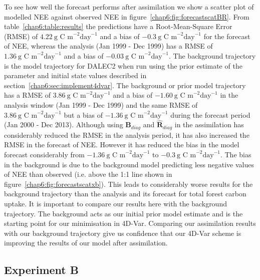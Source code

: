 To see how well the forecast performs after assimilation we show a scatter plot of modelled NEE against observed NEE in figure~\ref{chap6:fig:forecastscatBR}. From table~\ref{chap6:table:results} the predictions have a Root-Mean-Square Error (RMSE) of $4.22 ~\text{g C m}^{-2}\text{day}^{-1}$ and a bias of $-0.3 ~\text{g C m}^{-2}\text{day}^{-1}$ for the forecast of NEE, whereas the analysis (Jan 1999 - Dec 1999) has a RMSE of $1.36 ~\text{g C m}^{-2}\text{day}^{-1}$ and a bias of $-0.03 ~\text{g C m}^{-2}\text{day}^{-1}$. The background trajectory is the model trajectory for DALEC2 when run using the prior estimate of the parameter and initial state values described in section~\ref{chap6:sec:implement4dvar}. The background or prior model trajectory has a RMSE of $3.86 ~\text{g C m}^{-2}\text{day}^{-1}$ and a bias of $-1.60 ~\text{g C m}^{-2}\text{day}^{-1}$ in the analysis window (Jan 1999 - Dec 1999) and the same RMSE of $3.86 ~\text{g C m}^{-2}\text{day}^{-1}$ but a bias of $-1.36 ~\text{g C m}^{-2}\text{day}^{-1}$ during the forecast period (Jan 2000 - Dec 2013). Although using $\textbf{B}_{diag}$ and $\hat{\textbf{R}}_{diag}$ in the assimilation has considerably reduced the RMSE in the analysis period, it has also increased the RMSE in the forecast of NEE. However it has reduced the bias in the model forecast considerably from $-1.36 ~\text{g C m}^{-2}\text{day}^{-1}$ to $-0.3 ~\text{g C m}^{-2}\text{day}^{-1}$. The bias in the background is due to the background model predicting less negative values of NEE than observed (i.e. above the 1:1 line shown in figure~\ref{chap6:fig:forecastscatxb}). This leads to considerably worse results for the background trajectory than the analysis and its forecast for total forest carbon uptake. It is important to compare our results here with the background trajectory. The background acts as our initial prior model estimate and is the starting point for our minimisation in 4D-Var. Comparing our assimilation results with our background trajectory give us confidence that our 4D-Var scheme is improving the results of our model after assimilation.

\subsection{Experiment B} \label{chap6:sec:expb}

